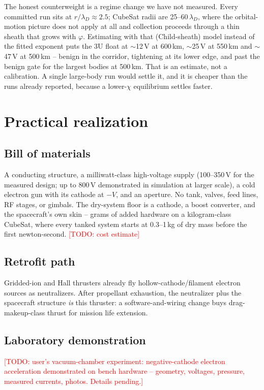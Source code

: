 \documentclass[11pt]{article}
\newcommand{\todo}[1]{\textcolor{red}{[TODO: #1]}}
\begin{document}
The honest counterweight is a regime change we have not measured. Every
committed run sits at $r/\lambda_D \approx 2.5$; CubeSat radii are
25--60\,$\lambda_D$, where the orbital-motion picture does not apply at all
and collection proceeds through a thin sheath that grows with $\varphi$.
Estimating with that (Child-sheath) model instead of the fitted exponent puts
the 3U float at $\sim$12\,V at 600\,km, $\sim$25\,V at 550\,km and
$\sim$47\,V at 500\,km -- benign in the corridor, tightening at its lower
edge, and past the benign gate for the largest bodies at 500\,km. That is an
estimate, not a calibration. A single large-body run would settle it, and it
is cheaper than the runs already reported, because a lower-$\chi$ equilibrium
settles faster.

\section{Practical realization}
\label{sec:practical}
\subsection{Bill of materials}
A conducting structure, a milliwatt-class high-voltage supply (100--350\,V
for the measured design; up to 800\,V demonstrated in simulation at larger
scale), a cold electron gun with its cathode at $-V$, and an aperture. No
tank, valves, feed lines, RF stages, or gimbals. The dry-system floor is a
cathode, a boost converter, and the spacecraft's own skin -- grams of added
hardware on a kilogram-class CubeSat, where every tanked system starts at
0.3--1\,kg of dry mass before the first newton-second.
\todo{cost estimate}
\subsection{Retrofit path}
Gridded-ion and Hall thrusters already fly hollow-cathode/filament electron
sources as neutralizers. After propellant exhaustion, the neutralizer plus
the spacecraft structure \emph{is} this thruster: a software-and-wiring
change buys drag-makeup-class thrust for mission life extension.
\subsection{Laboratory demonstration}
\todo{user's vacuum-chamber experiment: negative-cathode electron
acceleration demonstrated on bench hardware -- geometry, voltages, pressure,
measured currents, photos. Details pending.}
\end{document}
